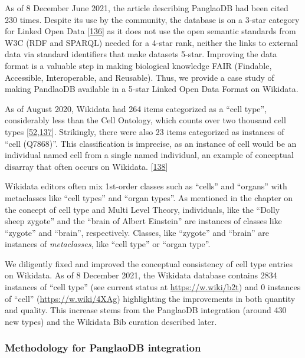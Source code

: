 As of 8 December June 2021, the article describing PanglaoDB had been cited 230 times.
Despite its use by the community, the database is on a 3-star category for Linked Open Data {[}\protect\hyperlink{ref-OGXYtGZ8}{136}{]} as it does not use the open semantic standards from W3C (RDF and SPARQL) needed for a 4-star rank, neither the links to external data via standard identifiers that make datasets 5-star.
Improving the data format is a valuable step in making biological knowledge FAIR (Findable, Accessible, Interoperable, and Reusable).
Thus, we provide a case study of making PandlaoDB available in a 5-star Linked Open Data Format on Wikidata.

As of August 2020, Wikidata had 264 items categorized as a ``cell type'', considerably less than the Cell Ontology, which counts over two thousand cell types {[}\protect\hyperlink{ref-agnqfdk6}{52},\protect\hyperlink{ref-4AEy2xhQ}{137}{]}.
Strikingly, there were also 23 items categorized as instances of ``cell (Q7868)''.
This classification is imprecise, as an instance of cell would be an individual named cell from a single named individual, an example of conceptual disarray that often occurs on Wikidata. {[}\protect\hyperlink{ref-imSZTi52}{138}{]}

Wikidata editors often mix 1st-order classes such as ``cells'' and ``organs'' with metaclasses like ``cell types'' and ``organ types''.
As mentioned in the chapter on the concept of cell type and Multi Level Theory, individuals, like the ``Dolly sheep zygote'' and the ``brain of Albert Einstein'' are instances of classes like ``zygote'' and ``brain'', respectively.
Classes, like ``zygote'' and ``brain'' are instances of \emph{metaclasses}, like ``cell type'' or ``organ type''.

We diligently fixed and improved the conceptual consistency of cell type entries on Wikidata.
As of 8 December 2021, the Wikidata database contains 2834 instances of ``cell type'' (see current status at \url{https://w.wiki/b2t}) and 0 instances of ``cell'' (\url{https://w.wiki/4XAg}) highlighting the improvements in both quantity and quality.
This increase stems from the PanglaoDB integration (around 430 new types) and the Wikidata Bib curation described later.

\hypertarget{methodology-for-panglaodb-integration}{%
\subsubsection{Methodology for PanglaoDB integration}\label{methodology-for-panglaodb-integration}}

